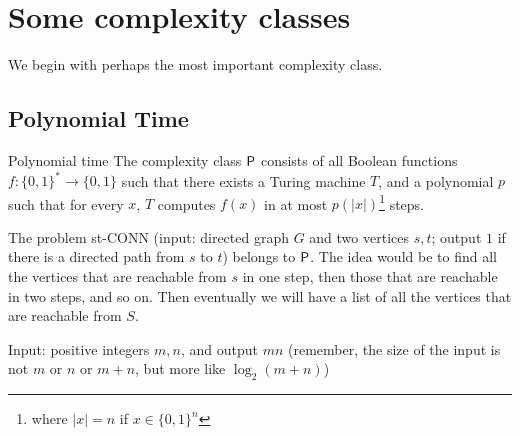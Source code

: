\documentclass{article}
\begin{document}
\section{Some complexity classes}
We begin with perhaps the most important complexity class.
\subsection{Polynomial Time}
\begin{fancydefine}{Polynomial time}
    The complexity class $\mathsf{P}$ consists of all Boolean functions $f: \{0,1\}^{*} \to \{0,1\}$ such that there exists a Turing machine $T$, and a polynomial $p$ such that for every $x$, $T$ computes $f(x)$ in at most $p(|x|)$\footnote{where $|x| = n$ if $x \in \{0,1\}^{n}$} steps.
\end{fancydefine}
\begin{ex}
    The problem st-CONN (input: directed graph $G$ and two vertices $s,t$; output $1$ if there is a directed path from $s$ to $t$) belongs to $\mathsf{P}$. The idea would be to find all the vertices that are reachable from $s$ in one step, then those that are reachable in two steps, and so on. Then eventually we will have a list of all the vertices that are reachable from $S$.
\end{ex}
\begin{ex}
    Input: positive integers $m,n$, and output $mn$ (remember, the size of the input is not $m$ or $n$ or $m+n$, but more like $\log_{2}(m + n)$)
\end{ex}

\newlec
\end{document}
